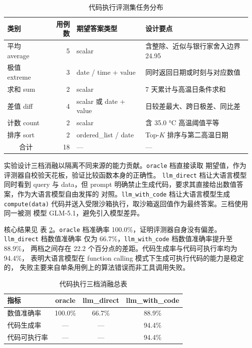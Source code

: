 \documentclass[a4paper]{article}
\newcommand{\song}{\CJKfamily{song}}
\newcommand{\wuhao}{\fontsize{10.5pt}{18pt}\selectfont}
\theoremstyle{definition}
\theoremstyle{plain}
\theoremstyle{remark}
\newcommand{\reftab}[1]{表 \ref{#1}}
\newcommand{\bk}{\discretionary{}{}{}}
\begin{document}
\begin{table}[!ht]
    \centering
    \caption{代码执行评测集任务分布}
    \label{tab:code-bench-design}
    \song\wuhao
    \begin{tabular}{lrll}
        \toprule
        类别 & 用例数 & 期望答案类型 & 设计要点 \\
        \midrule
        平均 average & 5 & scalar & 含整除、近似与银行家舍入边界 24.95 \\
        极值 extreme & 3 & date / time + value & 同时返回日期或时刻与对应数值 \\
        求和 sum & 2 & scalar & 7 天累计与高温日条件求和 \\
        差值 diff & 4 & scalar 或 date + value & 日较差最大、跨日极差、同比差 \\
        计数 count & 2 & scalar & 含 35.0 °C 高温阈值平等 \\
        排序 sort & 2 & ordered\_list / date & Top-$K$ 排序与第二高温日期 \\
        \midrule
        \multicolumn{1}{c}{合计} & 18 & --- & --- \\
        \bottomrule
    \end{tabular}
\end{table}

实验设计三档消融以隔离不同来源的能力贡献。\texttt{oracle} 档直接读取
期望值，作为评测器自校验天花板，验证比较函数本身的正确性。
\texttt{llm\_\bk{}direct} 档让大语言模型同时看到 query 与 data，但 prompt
明确禁止生成代码，要求其直接给出数值答案，作为大语言模型自由发挥的
对照。\texttt{llm\_\bk{}with\_\bk{}code} 档让大语言模型生成 \texttt{compute(data)}
代码并送入受限沙箱执行，取沙箱返回值作为最终答案。三档使用同一被测
模型 GLM-5.1，避免引入模型差异。

核心结果见 \reftab{tab:code-eval-overall}。\texttt{oracle} 档准确率
100.0\%，证明评测器自身没有偏差。\texttt{llm\_\bk{}direct} 档数值准确率
仅为 66.7\%，\texttt{llm\_\bk{}with\_\bk{}code} 档数值准确率提升至 88.9\%，
两档之间存在 22.2 个百分点的差距。代码生成率与代码可执行率均为 94.4\%，
表明大语言模型在 function calling 模式下生成可执行代码的能力是稳定的，
失败主要来自单条用例上的算法错误而非工具调用失败。

\begin{table}[!ht]
    \centering
    \caption{代码执行三档消融总表}
    \label{tab:code-eval-overall}
    \song\wuhao
    \begin{tabular}{lccc}
        \toprule
        指标 & oracle & llm\_direct & llm\_with\_code \\
        \midrule
        数值准确率 & 100.0\% & 66.7\% & 88.9\% \\
        代码生成率 & --- & --- & 94.4\% \\
        代码可执行率 & --- & --- & 94.4\% \\
        \bottomrule
    \end{tabular}
\end{table}
\end{document}
